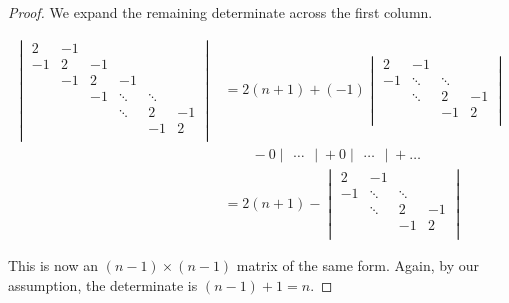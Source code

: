 \documentclass[12pt,letterpaper]{article}
\begin{document}
\begin{enumerate}
\begin{proof}
        We expand the remaining determinate across the first column.

        \begin{align*}
          \begin{vmatrix}
            2  & -1 &        &        &        &        \\
            -1 & 2  & -1     &        &        &        \\
               & -1 & 2      & -1     &        &        \\
               &    & -1     & \ddots & \ddots &        \\
               &    &        & \ddots & 2      & -1     \\
               &    &        &        & -1     & 2      \\
          \end{vmatrix}
          &= 2(n + 1)
            + (-1)
            \begin{vmatrix}
              2      & -1     &        &        \\
              -1     & \ddots & \ddots &        \\
                     & \ddots & 2      & -1     \\
                     &        & -1     & 2      \\
            \end{vmatrix} \\
          & \qquad - 0 \begin{vmatrix}\dots\end{vmatrix}
            + 0 \begin{vmatrix}\dots\end{vmatrix}
            + \dots \\
          &= 2(n + 1)
            -
            \begin{vmatrix}
              2      & -1     &        &        \\
              -1     & \ddots & \ddots &        \\
                     & \ddots & 2      & -1     \\
                     &        & -1     & 2      \\
            \end{vmatrix}
        \end{align*}

        This is now an $(n - 1) \times (n - 1)$ matrix of the same form.
        Again, by our assumption, the determinate is $(n-1) + 1 = n$.


\end{proof}
\end{enumerate}
\end{document}
